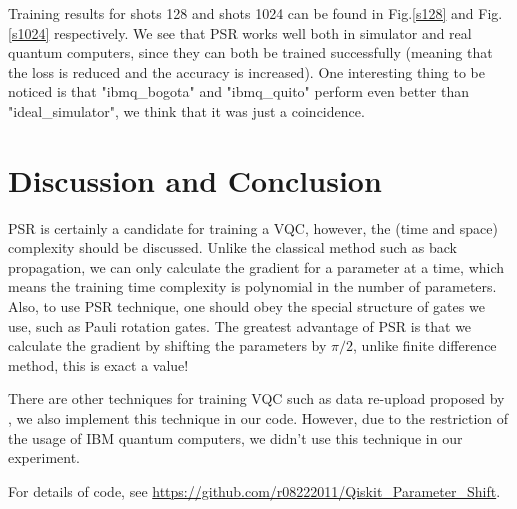 \documentclass{article}
\begin{document}
Training results for shots 128 and shots 1024 can be found in Fig.\ref{s128} and Fig.\ref{s1024} respectively. We see that PSR works well both in simulator and real quantum computers, since they can both be trained successfully (meaning that the loss is reduced and the accuracy is increased). One interesting thing to be noticed is that "ibmq\_bogota" and "ibmq\_quito" perform even better than "ideal\_simulator", we think that it was just a coincidence.

\section{Discussion and Conclusion}

PSR is certainly a candidate for training a VQC, however, the (time and space) complexity should be discussed. Unlike the classical method such as back propagation, we can only calculate the gradient for a parameter at a time, which means the training time complexity is polynomial in the number of parameters. Also, to use PSR technique, one should obey the special structure of gates we use, such as Pauli rotation gates. The greatest advantage of PSR is that we calculate the gradient by shifting the parameters by $\pi/2$, unlike finite difference method, this is exact a value!

There are other techniques for training VQC such as data re-upload proposed by \citet{reupload}, we also implement this technique in our code. However, due to the restriction of the usage of IBM quantum computers, we didn't use this technique in our experiment.

For details of code, see \url{https://github.com/r08222011/Qiskit\_Parameter\_Shift}.








\end{document}
